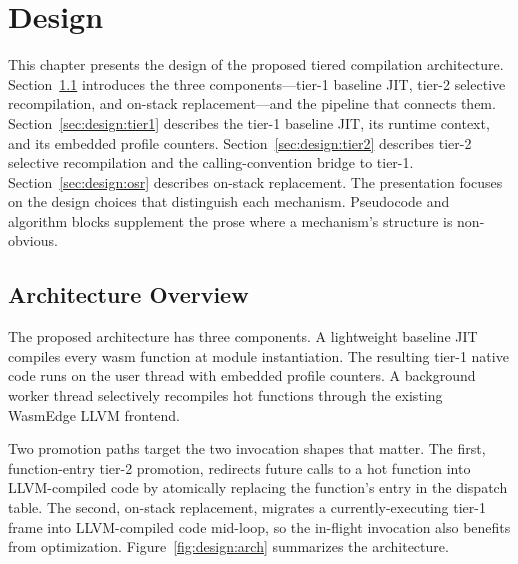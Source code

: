 
\chapter{Design}
\label{ch:design}

This chapter presents the design of the proposed tiered compilation architecture. Section~\ref{sec:design:overview} introduces the three components---tier-1 baseline JIT, tier-2 selective recompilation, and on-stack replacement---and the pipeline that connects them. Section~\ref{sec:design:tier1} describes the tier-1 baseline JIT, its runtime context, and its embedded profile counters. Section~\ref{sec:design:tier2} describes tier-2 selective recompilation and the calling-convention bridge to tier-1. Section~\ref{sec:design:osr} describes on-stack replacement. The presentation focuses on the design choices that distinguish each mechanism. Pseudocode and algorithm blocks supplement the prose where a mechanism's structure is non-obvious.

\section{Architecture Overview}
\label{sec:design:overview}

The proposed architecture has three components. A lightweight baseline JIT compiles every wasm function at module instantiation. The resulting tier-1 native code runs on the user thread with embedded profile counters. A background worker thread selectively recompiles hot functions through the existing WasmEdge LLVM frontend.

Two promotion paths target the two invocation shapes that matter. The first, function-entry tier-2 promotion, redirects future calls to a hot function into LLVM-compiled code by atomically replacing the function's entry in the dispatch table. The second, on-stack replacement, migrates a currently-executing tier-1 frame into LLVM-compiled code mid-loop, so the in-flight invocation also benefits from optimization. Figure~\ref{fig:design:arch} summarizes the architecture.

